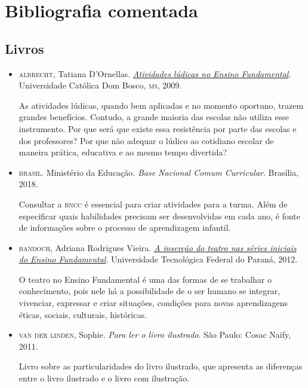\documentclass[11pt]{extarticle}
\begin{document}
\section{Bibliografia comentada}

\subsection{Livros}

\begin{itemize}

	\item \textsc{albrecht}, Tatiana D'Ornellas. \href{https://site.ucdb.br/public/md-dissertacoes/8072-atividades-ludicas-no-ensino-fundamental-uma-intervencao-pedagogica.pdf}{\textit{Atividades lúdicas no Ensino Fundamental}}. Universidade Católica Dom Bosco, \textsc{ms}, 2009. 

	As atividades lúdicas, quando bem aplicadas e no momento oportuno, trazem
grandes benefícios. Contudo, a grande maioria das escolas não utiliza esse instrumento. Por
que será que existe essa resistência por parte das escolas e dos professores? Por que não
adequar o lúdico ao cotidiano escolar de maneira prática, educativa e ao mesmo tempo
divertida?

\item \textsc{brasil}. Ministério da Educação. \textit{Base Nacional Comum Curricular}. Brasília, 2018.

Consultar a \textsc{bncc} é essencial para criar atividades para a turma. Além de especificar 
quais habilidades precisam ser desenvolvidas em cada ano, é fonte de informações sobre 
o processo de aprendizagem infantil. 

 \item \textsc{bandoch}, Adriana Rodrigues Vieira. \href{http://repositorio.utfpr.edu.br/jspui/bitstream/1/20738/2/MD_EDUMTE_II_2012_03.pdf}{\textit{A inserção do teatro nas séries iniciais do Ensino Fundamental}}.
 Universidade Tecnológica Federal do Paraná, 2012. 

	O teatro no Ensino Fundamental é uma das formas de se trabalhar o conhecimento,
pois nele há a possibilidade de o ser humano se integrar, vivenciar, expressar e
criar situações, condições para novas aprendizagens éticas, sociais, culturais,
históricas.


\item \textsc{van der linden}, Sophie. \textit{Para ler o livro ilustrado}. São Paulo: Cosac Naify, 2011.

Livro sobre as particularidades do livro ilustrado, que apresenta as diferenças entre o livro ilustrado e o livro com ilustração. 
\end{itemize}
\end{document}

